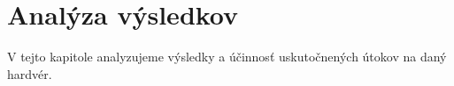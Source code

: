 \chapter{Analýza výsledkov}

\label{kap:vysledky} %

V tejto kapitole analyzujeme výsledky a účinnosť uskutočnených útokov na daný hardvér.